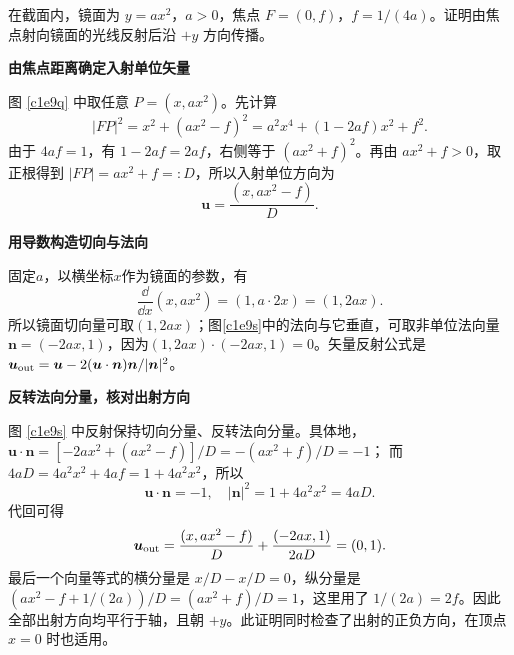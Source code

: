 \begin{question}
\begin{example}[抛物面镜的平行出射]
在截面内，镜面为 $y=ax^2$，$a>0$，焦点 $F=(0,f)$，$f=1/(4a)$。证明由焦点射向镜面的光线反射后沿 $+y$ 方向传播。
\end{example}
\end{question}
\begin{solution}\textbf{由焦点距离确定入射单位矢量}\par\nobreak
图 \ref{c1e9q} 中取任意 $P=(x,ax^2)$。先计算
\[
 |FP|^2=x^2+(ax^2-f)^2
 =a^2x^4+(1-2af)x^2+f^2.
\]
由于 $4af=1$，有 $1-2af=2af$，右侧等于 $(ax^2+f)^2$。再由 $ax^2+f>0$，取正根得到 $|FP|=ax^2+f=:D$，所以入射单位方向为
\[
 \bm u=\frac{(x,ax^2-f)}D.
\]


\par\medskip{}\noindent\textbf{用导数构造切向与法向}\par\nobreak
固定$a$，以横坐标$x$作为镜面的参数，有
\[
\frac{\dd}{\dd x}(x,ax^2)=(1,a\cdot2x)=(1,2ax).
\]
所以镜面切向量可取$(1,2ax)$；图\ref{c1e9s}中的法向与它垂直，可取非单位法向量$\bm n=(-2ax,1)$，因为$(1,2ax)\cdot(-2ax,1)=0$。矢量反射公式是
$\bm u_{\rm out}=\bm u-2(\bm u\cdot\bm n)\bm n/|\bm n|^2$。



\par\medskip{}\noindent\textbf{反转法向分量，核对出射方向}\par\nobreak
图 \ref{c1e9s} 中反射保持切向分量、反转法向分量。具体地，
$\bm u\cdot\bm n=[-2ax^2+(ax^2-f)]/D=-(ax^2+f)/D=-1$；
而 $4aD=4a^2x^2+4af=1+4a^2x^2$，所以
\[
 \bm u\cdot\bm n=-1,\quad |\bm n|^2=1+4a^2x^2=4aD.
\]
代回可得
\[
 \bm u_{\rm out}
 =\frac{(x,ax^2-f)}D+\frac{(-2ax,1)}{2aD}
 =(0,1).
\]
最后一个向量等式的横分量是 $x/D-x/D=0$，纵分量是
$(ax^2-f+1/(2a))/D=(ax^2+f)/D=1$，这里用了 $1/(2a)=2f$。因此全部出射方向均平行于轴，且朝 $+y$。此证明同时检查了出射的正负方向，在顶点 $x=0$ 时也适用。
\end{solution}

